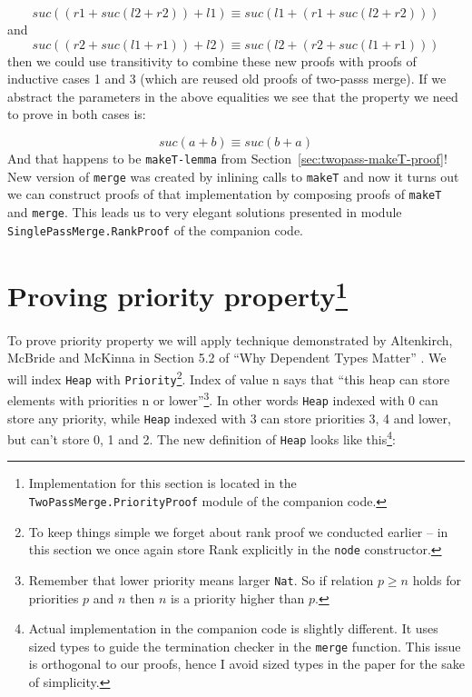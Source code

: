 \begin{equation*}
suc ((r1 + suc (l2 + r2)) + l1) ≡ suc (l1 + (r1 + suc (l2 + r2)))
\end{equation*}
\noindent
and
\begin{equation*}
suc ((r2 + suc (l1 + r1)) + l2) ≡ suc (l2 + (r2  + suc (l1 + r1)))
\end{equation*}
\noindent
then we could use transitivity to combine these new proofs with proofs of inductive cases 1 and 3 (which are reused old proofs of two-passs merge). If we abstract the parameters in the above equalities we see that the property we need to prove in both cases is:

\begin{equation*}
suc (a + b) ≡ suc (b + a)
\end{equation*}
\noindent
And that happens to be \texttt{makeT-lemma} from Section~\ref{sec:twopass-makeT-proof}! New version of \texttt{merge} was created by inlining calls to \texttt{makeT} and now it turns out we can construct proofs of that implementation by composing proofs of \texttt{makeT} and \texttt{merge}. This leads us to very elegant solutions presented in module \texttt{SinglePassMerge.}\texttt{RankProof} of the companion code.

\section[Proving priority property]{Proving priority property\footnote{Implementation for this section is located in the \texttt{TwoPassMerge.}\texttt{PriorityProof} module of the companion code.}}

To prove priority property we will apply technique demonstrated by Altenkirch, McBride and McKinna in Section 5.2 of ``Why Dependent Types Matter'' \cite{AltMcBMcK05}. We will index \texttt{Heap} with \texttt{Priority}\footnote{To keep things simple we forget about rank proof we conducted earlier -- in this section we once again store Rank explicitly in the \texttt{node} constructor.}. Index of value n says that ``this heap can store elements with priorities n or lower''\footnote{Remember that lower priority means larger \texttt{Nat}. So if relation $p ≥ n$ holds for priorities $p$ and $n$ then $n$ is a priority higher than $p$.}. In other words \texttt{Heap} indexed with 0 can store any priority, while \texttt{Heap} indexed with 3 can store priorities 3, 4 and lower, but can't store 0, 1 and 2. The new definition of \texttt{Heap} looks like this\footnote{Actual implementation in the companion code is slightly different. It uses sized types \cite{Abe08} to guide the termination checker in the \texttt{merge} function. This issue is orthogonal to our proofs, hence I avoid sized types in the paper for the sake of simplicity.}:

